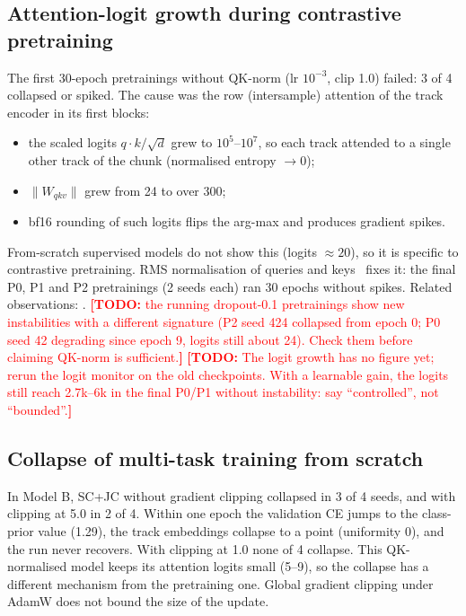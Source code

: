 \documentclass[11pt,a4paper]{article}
\newcommand{\todo}[1]{\textcolor{red}{\textbf{[TODO:} #1\textbf{]}}}
\begin{document}
\subsection{Attention-logit growth during contrastive pretraining}
The first 30-epoch pretrainings without QK-norm (lr $10^{-3}$, clip 1.0) failed: 3 of 4
collapsed or spiked. The cause was the row (intersample) attention of the track encoder in
its first blocks:
\begin{itemize}
  \item the scaled logits $q\cdot k/\sqrt d$ grew to $10^5$--$10^7$, so each track attended
        to a single other track of the chunk (normalised entropy $\to0$);
  \item $\|W_{qkv}\|$ grew from 24 to over 300;
  \item bf16 rounding of such logits flips the arg-max and produces gradient spikes.
\end{itemize}
From-scratch supervised models do not show this (logits $\approx20$), so it is specific to
contrastive pretraining. RMS normalisation of queries and keys~\citep{Henry2020QKNorm,Dehghani2023ViT22B}
fixes it: the final P0, P1 and P2 pretrainings (2 seeds each) ran 30 epochs without
spikes. Related observations: \citep{Wortsman2024SmallScaleProxies,Zhai2023EntropyCollapse}.
\todo{the running dropout-0.1 pretrainings show new instabilities with a different
signature (P2 seed 424 collapsed from epoch 0; P0 seed 42 degrading since epoch 9, logits
still about 24). Check them before claiming QK-norm is sufficient.}
\todo{The logit growth has no figure yet; rerun the logit monitor on the old checkpoints.
With a learnable gain, the logits still reach 2.7k--6k in the final P0/P1 without
instability: say ``controlled'', not ``bounded''.}

\subsection{Collapse of multi-task training from scratch}
In Model B, SC+JC without gradient clipping collapsed in 3 of 4 seeds, and with clipping at
5.0 in 2 of 4. Within one epoch the validation CE jumps to the class-prior value (1.29), the
track embeddings collapse to a point (uniformity 0), and the run never recovers. With
clipping at 1.0 none of 4 collapse. This QK-normalised model keeps its attention logits
small (5--9), so the collapse has a different mechanism from the pretraining one. Global
gradient clipping under AdamW does not bound the size of the update.
\end{document}

